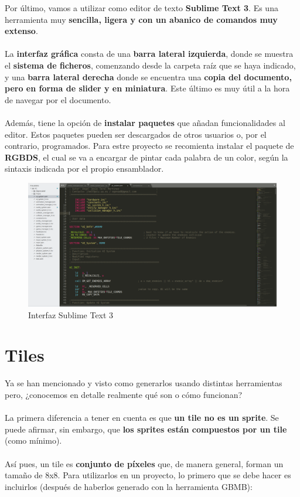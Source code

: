 Por último, vamos a utilizar como editor de texto \textbf{Sublime Text 3}. Es una herramienta muy \textbf{sencilla, ligera y con un abanico de comandos muy extenso}. 
\\ \\
La \textbf{interfaz gráfica} consta de una \textbf{barra lateral izquierda}, donde se muestra el \textbf{sistema de ficheros}, comenzando desde la carpeta raíz que se haya indicado, y una \textbf{barra lateral derecha} donde se encuentra una \textbf{copia del documento, pero en forma de slider y en miniatura}. Este último es muy útil a la hora de navegar por el documento.
\\ \\
Además, tiene la opción de \textbf{instalar paquetes} que añadan funcionalidades al editor. Estos paquetes pueden ser descargados de otros usuarios o, por el contrario, programados. Para estre proyecto se recomienta instalar el paquete de \textbf{RGBDS}, el cual se va a encargar de pintar cada palabra de un color, según la sintaxis indicada por el propio ensamblador.

\begin{figure}[h]
\centering
\includegraphics[width=1\textwidth]{include/images/manual/sublime.png}
\caption{Interfaz Sublime Text 3}
\label{figure:sublime}
\end{figure}

\clearpage

\section{Tiles}

Ya se han mencionado y visto como generarlos usando distintas herramientas pero, ¿conocemos en detalle realmente qué son o cómo funcionan?
\\ \\
La primera diferencia a tener en cuenta es que \textbf{un tile no es un sprite}. Se puede afirmar, sin embargo, que \textbf{los sprites están compuestos por un tile} (como mínimo). 
\\ \\
Así pues, un tile es \textbf{conjunto de píxeles} que, de manera general, forman un tamaño de 8x8. Para utilizarlos en un proyecto, lo primero que se debe hacer es incluirlos (después de haberlos generado con la herramienta GBMB):

